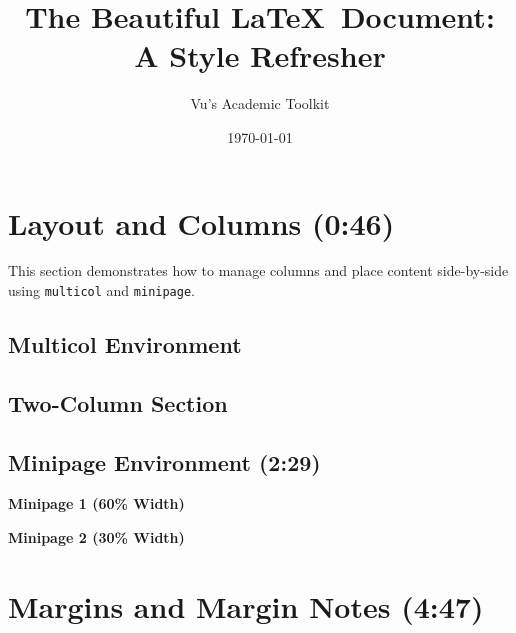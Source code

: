 \documentclass[11pt]{article}
\begin{document}
\title{The Beautiful \LaTeX\ Document: A Style Refresher}
\author{Vu's Academic Toolkit}
\date{\today}
\maketitle

\section{Layout and Columns (0:46)}

This section demonstrates how to manage columns and place content side-by-side using \texttt{multicol} and \texttt{minipage}.

\subsection{Multicol Environment}

\begin{multicols}{2}
    \section*{Two-Column Section} %
    \noindent\hrulefill %
    \lipsum[1-2]
    \columnbreak %
    \lipsum[3]
\end{multicols}

\subsection{Minipage Environment (2:29)}

\noindent
\begin{minipage}[t]{0.6\linewidth} %
    \centering
    \textbf{Minipage 1 (60\% Width)}
    \hrulefill
    \lipsum[4][1-5] %
\end{minipage}%
\hspace{10pt}%
\begin{minipage}[t]{0.3\linewidth} %
    \centering
    \textbf{Minipage 2 (30\% Width)}
    \hrulefill
    \lipsum[5][1-5]
\end{minipage}

\section{Margins and Margin Notes (4:47)}
\end{document}
